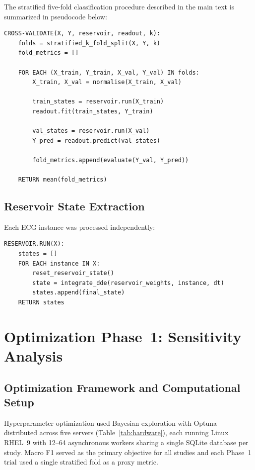 \documentclass[journal=asbcd6,manuscript=suppinfo]{achemso}
\begin{document}
The stratified five-fold classification procedure described in the main text is summarized in pseudocode below:

\begin{verbatim}
CROSS-VALIDATE(X, Y, reservoir, readout, k):
    folds = stratified_k_fold_split(X, Y, k)
    fold_metrics = []

    FOR EACH (X_train, Y_train, X_val, Y_val) IN folds:
        X_train, X_val = normalise(X_train, X_val)

        train_states = reservoir.run(X_train)
        readout.fit(train_states, Y_train)

        val_states = reservoir.run(X_val)
        Y_pred = readout.predict(val_states)

        fold_metrics.append(evaluate(Y_val, Y_pred))

    RETURN mean(fold_metrics)
\end{verbatim}

\subsection{Reservoir State Extraction}

Each ECG instance was processed independently:

\begin{verbatim}
RESERVOIR.RUN(X):
    states = []
    FOR EACH instance IN X:
        reset_reservoir_state()
        state = integrate_dde(reservoir_weights, instance, dt)
        states.append(final_state)
    RETURN states
\end{verbatim}

\section{Optimization Phase~1: Sensitivity Analysis}

\subsection{Optimization Framework and Computational Setup}

Hyperparameter optimization used Bayesian exploration with Optuna~\cite{Akiba2019} distributed across five servers (Table~\ref{tab:hardware}), each running Linux RHEL~9 with 12--64 asynchronous workers sharing a single SQLite database per study.
Macro F1 served as the primary objective for all studies and each Phase~1 trial used a single stratified fold as a proxy metric.
\end{document}
